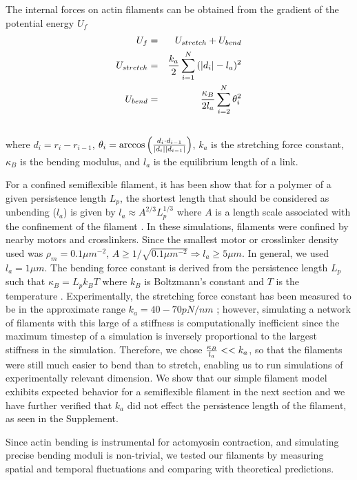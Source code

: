 \documentclass[12pt]{article}
\begin{document}
The internal forces on actin filaments can be obtained from the gradient of the potential energy $U_f$
\begin{eqnarray}
  U_f &=& U_{stretch} + U_{bend}\\
  U_{stretch}&=&{k_a\over2}\sum_{i=1}^{N}{(|d_i| - l_a)^2}\\\nonumber
  U_{bend}&=&{\kappa_B\over 2l_a}\sum_{i=2}^N{\theta_i^2}\\\nonumber
  \label{eqn:Ufil}
\end{eqnarray}
where $d_i = r_i-r_{i-1}$, $\theta_i = \arccos{\left({d_i\cdot d_{i-1}\over |d_i||d_{i-1}|}\right)}$, $k_a$ is the
stretching force constant, $\kappa_B$ is the bending modulus, and $l_a$ is the equilibrium length of a
link. 
\par
For a confined semiflexible filament, it has been show that for a polymer of a given persistence length $L_p$, the shortest length that should be considered as unbending ($l_a$) is given by $l_a\approx A^{2/3}L_p^{1/3}$ where $A$ is a length scale associated with the confinement of the
filament \cite{odijk1983}. In these simulations, filaments were confined by nearby motors and crosslinkers. Since the smallest motor or crosslinker density used was $\rho_m=0.1\mu m^{-2}$, $A\ge1/\sqrt{0.1\mu m^{-2}}\Rightarrow l_a\ge5\mu m$. In general, we used $l_a=1\mu m$.
The bending force constant is derived from the persistence length $L_p$ such that
$\kappa_B = L_p k_B T$ where $k_B$ is Boltzmann's constant and $T$ is the temperature \cite{rubinstein}. Experimentally,
the stretching force constant has been measured to be in the approximate range $k_a=40-70pN/nm$ \cite{kojima1994, higuchi1995}; however, simulating a
network of filaments with this large of a stiffness is computationally inefficient since the maximum timestep of a
simulation is inversely proportional to the largest stiffness in the simulation. Therefore, we chose ${\kappa_B\over
l_a} <<k_a$, so that the filaments were still much easier to bend than to stretch, enabling us to run simulations of
experimentally relevant dimension. We show that our simple filament model exhibits expected behavior for a semiflexible
filament in the next section and we have further verified that $k_a$ did not effect the persistence length of the
filament, as seen in the Supplement. 
\par
Since actin bending is instrumental for actomyosin contraction, and simulating precise bending moduli is non-trivial, we tested our filaments by measuring spatial and temporal fluctuations and comparing with theoretical predictions.
\end{document}
